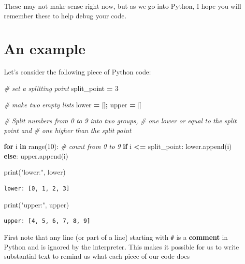 \documentclass[
  letterpaper,
]{scrbook}
\newenvironment{Shaded}{\begin{snugshade}}{\end{snugshade}}
\newcommand{\BuiltInTok}[1]{#1}
\newcommand{\CommentTok}[1]{\textcolor[rgb]{0.56,0.35,0.01}{\textit{#1}}}
\newcommand{\ControlFlowTok}[1]{\textcolor[rgb]{0.13,0.29,0.53}{\textbf{#1}}}
\newcommand{\DecValTok}[1]{\textcolor[rgb]{0.00,0.00,0.81}{#1}}
\newcommand{\KeywordTok}[1]{\textcolor[rgb]{0.13,0.29,0.53}{\textbf{#1}}}
\newcommand{\NormalTok}[1]{#1}
\newcommand{\OperatorTok}[1]{\textcolor[rgb]{0.81,0.36,0.00}{\textbf{#1}}}
\newcommand{\StringTok}[1]{\textcolor[rgb]{0.31,0.60,0.02}{#1}}
\begin{document}
These may not make sense right now, but as we go into Python, I hope you will remember these to help debug your code.

\hypertarget{an-example}{%
\section{An example}\label{an-example}}

Let's consider the following piece of Python code:

\begin{Shaded}
\begin{Highlighting}[]
\CommentTok{# set a splitting point}
\NormalTok{split_point }\OperatorTok{=} \DecValTok{3}

\CommentTok{# make two empty lists}
\NormalTok{lower }\OperatorTok{=}\NormalTok{ []}\OperatorTok{;}\NormalTok{ upper }\OperatorTok{=}\NormalTok{ []}

\CommentTok{# Split numbers from 0 to 9 into two groups, }
\CommentTok{# one lower or equal to the split point and }
\CommentTok{# one higher than the split point}

\ControlFlowTok{for}\NormalTok{ i }\KeywordTok{in} \BuiltInTok{range}\NormalTok{(}\DecValTok{10}\NormalTok{):  }\CommentTok{# count from 0 to 9}
    \ControlFlowTok{if}\NormalTok{ i }\OperatorTok{<=}\NormalTok{ split_point:}
\NormalTok{        lower.append(i)}
    \ControlFlowTok{else}\NormalTok{:}
\NormalTok{        upper.append(i)}

\BuiltInTok{print}\NormalTok{(}\StringTok{"lower:"}\NormalTok{, lower)}
\end{Highlighting}
\end{Shaded}

\begin{verbatim}
lower: [0, 1, 2, 3]
\end{verbatim}

\begin{Shaded}
\begin{Highlighting}[]
\BuiltInTok{print}\NormalTok{(}\StringTok{"upper:"}\NormalTok{, upper)}
\end{Highlighting}
\end{Shaded}

\begin{verbatim}
upper: [4, 5, 6, 7, 8, 9]
\end{verbatim}

First note that any line (or part of a line) starting with \texttt{\#} is a \textbf{comment} in Python and is ignored by the interpreter. This makes it possible for us to write substantial text to remind us what each piece of our code does
\end{document}
